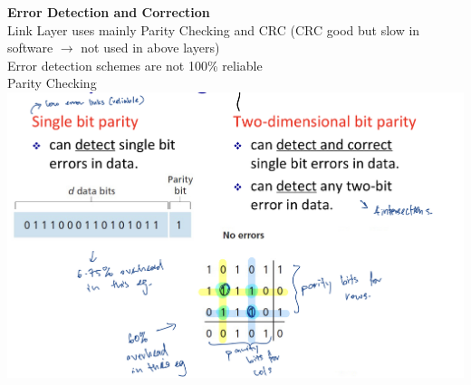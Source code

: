 \documentclass[10pt, a4paper]{article}
\newcommand{\blue}[1]{{\color{MidnightBlue}#1}}
\begin{document}
\begin{multicols*}{3}
		\textbf{Error Detection and Correction}\\
		Link Layer uses mainly \blue{Parity Checking} and \blue{CRC} (CRC good but slow in software $\rightarrow$ not used in above layers)\\
		Error detection schemes are not 100\% reliable\\

		Parity Checking\\
		\includegraphics[scale=.15]{./assets/parityChecking}


\end{multicols*}
\end{document}
